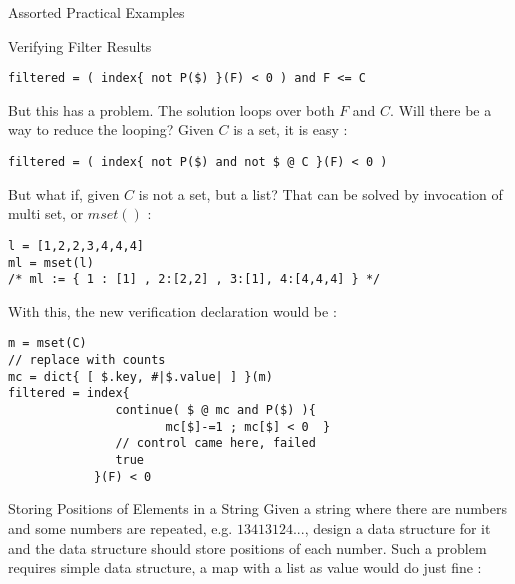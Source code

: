 \begin{section}{Assorted Practical Examples}
\begin{subsection}{Verifying Filter Results}
\begin{center}\begin{minipage}{\linewidth}
\begin{lstlisting}[style=JexlStyle]
filtered = ( index{ not P($) }(F) < 0 ) and F <= C  
\end{lstlisting}  
\end{minipage}\end{center}
But this has a problem. The solution loops over both $F$ and $C$. 
Will there be a way to reduce the looping? Given $C$ is a set, it is easy :

\begin{center}\begin{minipage}{\linewidth}
\begin{lstlisting}[style=JexlStyle]
filtered = ( index{ not P($) and not $ @ C }(F) < 0 )
\end{lstlisting}  
\end{minipage}\end{center}

But what if, given $C$ is not a set, but a list? That can be solved by
invocation of multi set, or $mset()$  :
\begin{center}\begin{minipage}{\linewidth}
\begin{lstlisting}[style=JexlStyle]
l = [1,2,2,3,4,4,4]
ml = mset(l)
/* ml := { 1 : [1] , 2:[2,2] , 3:[1], 4:[4,4,4] } */
\end{lstlisting}  
\end{minipage}\end{center}
With this, the new verification declaration would be :

\begin{center}\begin{minipage}{\linewidth}
\begin{lstlisting}[style=JexlStyle]
m = mset(C)
// replace with counts 
mc = dict{ [ $.key, #|$.value| ] }(m)
filtered = index{ 
               continue( $ @ mc and P($) ){  
                      mc[$]-=1 ; mc[$] < 0  }
               // control came here, failed         
               true    
            }(F) < 0 
\end{lstlisting}  
\end{minipage}\end{center}
 
\end{subsection}

\begin{subsection}{Storing Positions of Elements in a String}
Given a string where there are numbers and some numbers are repeated, e.g. $13413124...$, 
design a data structure for it and the data structure should store positions of each number.
Such a problem requires simple data structure, a map with a list as value would do just fine :


\end{subsection}
\end{section}
